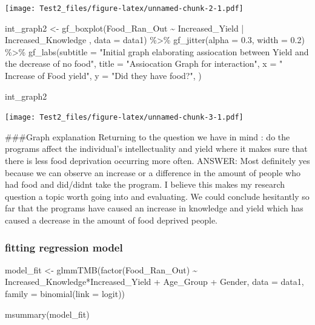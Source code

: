 \documentclass[
]{article}
\newenvironment{Shaded}{\begin{snugshade}}{\end{snugshade}}
\newcommand{\AttributeTok}[1]{\textcolor[rgb]{0.77,0.63,0.00}{#1}}
\newcommand{\FloatTok}[1]{\textcolor[rgb]{0.00,0.00,0.81}{#1}}
\newcommand{\FunctionTok}[1]{\textcolor[rgb]{0.00,0.00,0.00}{#1}}
\newcommand{\NormalTok}[1]{#1}
\newcommand{\OtherTok}[1]{\textcolor[rgb]{0.56,0.35,0.01}{#1}}
\newcommand{\SpecialCharTok}[1]{\textcolor[rgb]{0.00,0.00,0.00}{#1}}
\newcommand{\StringTok}[1]{\textcolor[rgb]{0.31,0.60,0.02}{#1}}
\begin{document}
\texttt{[image: Test2\_files/figure-latex/unnamed-chunk-2-1.pdf]}

\begin{Shaded}
\begin{Highlighting}[]
\NormalTok{int\_graph2 }\OtherTok{\textless{}{-}} \FunctionTok{gf\_boxplot}\NormalTok{(Food\_Ran\_Out }\SpecialCharTok{\textasciitilde{}}\NormalTok{ Increased\_Yield }\SpecialCharTok{|}\NormalTok{ Increased\_Knowledge ,  }\AttributeTok{data =}\NormalTok{ data1) }\SpecialCharTok{\%\textgreater{}\%}
  \FunctionTok{gf\_jitter}\NormalTok{(}\AttributeTok{alpha =} \FloatTok{0.3}\NormalTok{, }\AttributeTok{width =} \FloatTok{0.2}\NormalTok{) }\SpecialCharTok{\%\textgreater{}\%}
   \FunctionTok{gf\_labs}\NormalTok{(}\AttributeTok{subtitle =} \StringTok{"Initial graph elaborating assiocation between Yield and the decrease of no food"}\NormalTok{,}
          \AttributeTok{title =} \StringTok{"Assiocation Graph for interaction"}\NormalTok{,}
          \AttributeTok{x =} \StringTok{" Increase of Food yield"}\NormalTok{,}
          \AttributeTok{y =} \StringTok{"Did they have food?"}\NormalTok{, }
\NormalTok{           )}

\NormalTok{int\_graph2}
\end{Highlighting}
\end{Shaded}

\texttt{[image: Test2\_files/figure-latex/unnamed-chunk-3-1.pdf]}

\#\#\#Graph explanation Returning to the question we have in mind : do
the programs affect the individual's intellectuality and yield where it
makes sure that there is less food deprivation occurring more often.
ANSWER: Most definitely yes because we can observe an increase or a
difference in the amount of people who had food and did/didnt take the
program. I believe this makes my research question a topic worth going
into and evaluating. We could conclude hesitantly so far that the
programs have caused an increase in knowledge and yield which has caused
a decrease in the amount of food deprived people.

\hypertarget{fitting-regression-model}{%
\subsubsection{fitting regression
model}\label{fitting-regression-model}}

\begin{Shaded}
\begin{Highlighting}[]
\NormalTok{model\_fit }\OtherTok{\textless{}{-}} \FunctionTok{glmmTMB}\NormalTok{(}\FunctionTok{factor}\NormalTok{(Food\_Ran\_Out) }\SpecialCharTok{\textasciitilde{}}\NormalTok{ Increased\_Knowledge}\SpecialCharTok{*}\NormalTok{Increased\_Yield }\SpecialCharTok{+}\NormalTok{ Age\_Group }\SpecialCharTok{+}\NormalTok{ Gender, }
                 \AttributeTok{data =}\NormalTok{ data1, }
                 \AttributeTok{family =} \FunctionTok{binomial}\NormalTok{(}\AttributeTok{link =} \StringTok{\textquotesingle{}logit\textquotesingle{}}\NormalTok{))}


\FunctionTok{msummary}\NormalTok{(model\_fit)}
\end{Highlighting}
\end{Shaded}
\end{document}
